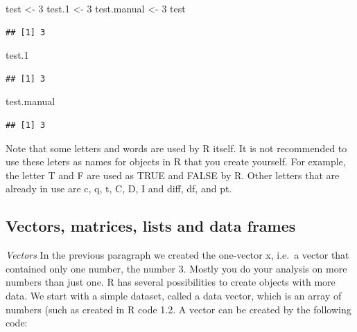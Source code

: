 \documentclass[]{book}
\newenvironment{Shaded}{\begin{snugshade}}{\end{snugshade}}
\newcommand{\DecValTok}[1]{\textcolor[rgb]{0.00,0.00,0.81}{#1}}
\newcommand{\StringTok}[1]{\textcolor[rgb]{0.31,0.60,0.02}{#1}}
\newcommand{\NormalTok}[1]{#1}
\begin{document}
\begin{Shaded}
\begin{Highlighting}[]
\NormalTok{test <-}\StringTok{ }\DecValTok{3}
\NormalTok{test.}\DecValTok{1}\NormalTok{ <-}\StringTok{ }\DecValTok{3}
\NormalTok{test.manual <-}\StringTok{ }\DecValTok{3}
\NormalTok{test}
\end{Highlighting}
\end{Shaded}

\begin{verbatim}
## [1] 3
\end{verbatim}

\begin{Shaded}
\begin{Highlighting}[]
\NormalTok{test.}\DecValTok{1}
\end{Highlighting}
\end{Shaded}

\begin{verbatim}
## [1] 3
\end{verbatim}

\begin{Shaded}
\begin{Highlighting}[]
\NormalTok{test.manual }
\end{Highlighting}
\end{Shaded}

\begin{verbatim}
## [1] 3
\end{verbatim}

Note that some letters and words are used by R itself. It is not
recommended to use these leters as names for objects in R that you
create yourself. For example, the letter T and F are used as TRUE and
FALSE by R. Other letters that are already in use are c, q, t, C, D, I
and diff, df, and pt.

\subsection{Vectors, matrices, lists and data
frames}\label{vectors-matrices-lists-and-data-frames}

\emph{Vectors} In the previous paragraph we created the one-vector x,
i.e.~a vector that contained only one number, the number 3. Mostly you
do your analysis on more numbers than just one. R has several
possibilities to create objects with more data. We start with a simple
dataset, called a data vector, which is an array of numbers (such as
created in R code 1.2. A vector can be created by the following code:
\end{document}
